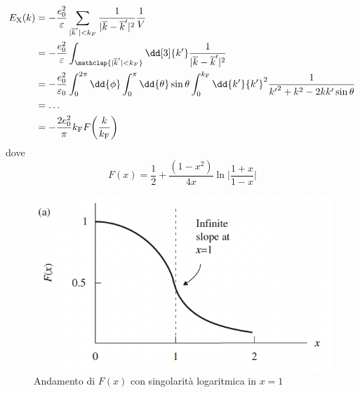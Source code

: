 \begin{equation*}
    \begin{aligned}
        E_{\text X}(k) & =-\frac{e_0^2}{\varepsilon}\sum_{|\overline k'|<k_F}\frac{1}{|\overline k - \overline k'|^2}\frac{1}{V} \\
        & = -\frac{e_0^2}{\varepsilon}\int_{\mathclap{|\overline k'|<k_F}}\dd[3]{k'}\frac{1}{|\overline k - \overline k'|^2} \\
        & = - \frac{e_0^2}{\varepsilon_0}\int_0^{2\pi}\dd{\phi}\int_0^\pi\dd{\theta}\sin\theta\int_0^{k_{\text F}}\dd{k'}{k'}^2\frac{1}{{k'}^2+k^2-2kk'\sin\theta}\\
        & = \dots\\
        & = -\frac{2e_0^2}{\pi}k_{\text{F}}F\bigg(\frac{k}{k_{\text F}}\bigg)\\
    \end{aligned}
\end{equation*}
dove
\begin{equation*}
    F(x)=\frac 12 + \frac{(1-x^2)}{4x}\ln\Bigg|\frac{1+x}{1-x}\Bigg|    
\end{equation*}
\begin{figure}[!ht]
    \centering
    \includegraphics[scale=0.6]{images/F(x)jellium.png}
    \caption{Andamento di $F(x)$ con singolarità logaritmica in $x=1$}
    \label{fig:fxjellium}
\end{figure}
\newpage
